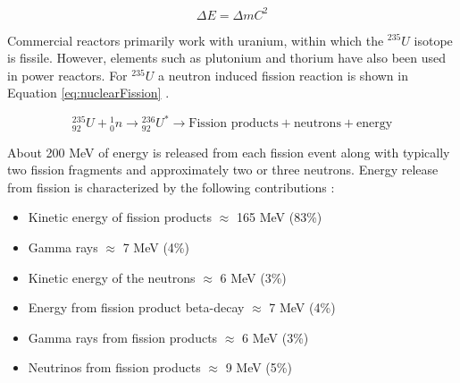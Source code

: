 \begin{equation}
    \Delta E = \Delta m C^{2}
    \label{eq:Einstein}
\end{equation}

Commercial reactors primarily work with uranium, within which the ${}^{235}U$ isotope is fissile. However, elements such as plutonium and thorium have also been used in power reactors. For ${}^{235}U$ a neutron induced fission reaction is shown in Equation \ref{eq:nuclearFission} \cite{duderstadt1976}.

\begin{equation}
    {}^{235}_{92}U + {}^{1}_{0}n \rightarrow {}^{236}_{92}U^{*} \rightarrow \text{Fission products} + \text{neutrons} + \text{energy}
    \label{eq:nuclearFission}
\end{equation}

About 200 MeV of energy is released from each fission event along with typically two fission fragments and approximately two or three neutrons. Energy release from fission is characterized by the following contributions \cite{fissionBasics}:

\begin{itemize}[label={}]
    \item Kinetic energy of fission products $\approx$ 165 MeV (83\%) 
    \item Gamma rays $\approx$ 7 MeV (4\%)
    \item Kinetic energy of the neutrons $\approx$ 6 MeV (3\%) 
    \item Energy from fission product beta-decay $\approx$ 7 MeV (4\%) 
    \item Gamma rays from fission products $\approx$ 6 MeV (3\%)
    \item Neutrinos from fission products $\approx$ 9 MeV (5\%) 
\end{itemize}

